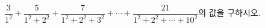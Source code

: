 $\dfrac{3}{1^2}+\dfrac{5}{1^2+2^2}+\dfrac{7}{1^2+2^2+3^2}+\cdots+\dfrac{21}{1^2+2^2+\cdots+10^2}$의 값을 구하시오.
